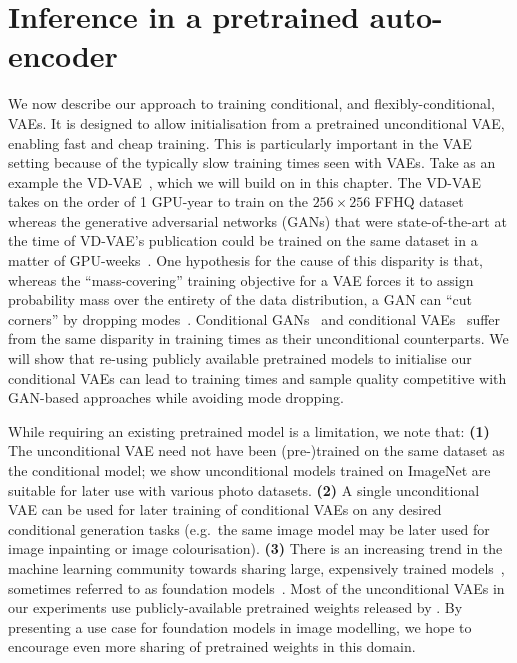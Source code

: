 \section{Inference in a pretrained auto-encoder}
\label{sec:ipa}

We now describe our approach to training conditional, and flexibly-conditional, VAEs. It is designed to allow initialisation from a pretrained unconditional VAE, enabling fast and cheap training.  This is particularly important in the VAE setting because of the typically slow training times seen with VAEs. Take as an example the VD-VAE~\citep{child2020very}, which we will build on in this chapter. The VD-VAE takes on the order of 1 GPU-year to train on the $256\times256$ FFHQ dataset~\citep{karras2019style} whereas the generative adversarial networks (GANs) that were state-of-the-art at the time of VD-VAE's publication could be trained on the same
dataset in a matter of GPU-weeks~\citep{lin2021anycost,karras2020analyzing}. One hypothesis for the cause of this disparity
is that, whereas the ``mass-covering'' training objective for a VAE forces it to
assign probability mass over the entirety of the data distribution, a GAN can
``cut corners'' by dropping modes~\citep{arora2017gans,arora2017generalization}. Conditional GANs~\citep{zheng2019pluralistic,zhao2021large} and conditional VAEs~\citep{sohn2015learning,ivanov2018variational} suffer from the same disparity in training times as their unconditional counterparts. We will show that re-using publicly available pretrained models to initialise our conditional VAEs can lead to training times and sample quality competitive with GAN-based approaches while avoiding mode dropping.



While requiring an existing pretrained model is a limitation, we note that:
\textbf{(1)} The unconditional VAE need not have been (pre-)trained on the same dataset as the conditional model; we show unconditional models trained on
ImageNet are suitable for later use with various photo datasets.
\textbf{(2)} A single unconditional VAE can be used for later training of
conditional VAEs on any desired conditional generation tasks (e.g.~the same
image model may be later used for image inpainting or image colourisation).
\textbf{(3)} There is an increasing trend in the machine learning community towards
sharing large, expensively trained models~\citep{wolf2020transformers},
sometimes referred to as foundation models~\citep{bommasani2021opportunities}.
Most of the unconditional VAEs in our experiments use publicly-available
pretrained weights released by \citet{child2020very}. By presenting a use case
for foundation models in image modelling, we hope to encourage even more sharing
of pretrained weights in this domain.

